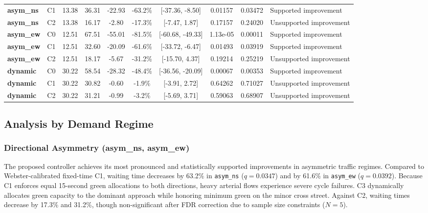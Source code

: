 \documentclass[11pt,journal,onecolumn]{article}
\begin{document}
\begin{table}[htbp]
\begin{tabularx}{\textwidth}{lccccccccX}
\textbf{asym\_ns} & C1 & 13.38 & 36.31 & -22.93 & -63.2\% & [-37.36, -8.50] & 0.01157 & 0.03472 & Supported improvement \\
\textbf{asym\_ns} & C2 & 13.38 & 16.17 & -2.80 & -17.3\% & [-7.47, 1.87] & 0.17157 & 0.24020 & Unsupported improvement \\
\midrule
\textbf{asym\_ew} & C0 & 12.51 & 67.51 & -55.01 & -81.5\% & [-60.68, -49.33] & 1.13e-05 & 0.00011 & Supported improvement \\
\textbf{asym\_ew} & C1 & 12.51 & 32.60 & -20.09 & -61.6\% & [-33.72, -6.47] & 0.01493 & 0.03919 & Supported improvement \\
\textbf{asym\_ew} & C2 & 12.51 & 18.17 & -5.67 & -31.2\% & [-15.70, 4.37] & 0.19214 & 0.25219 & Unsupported improvement \\
\midrule
\textbf{dynamic} & C0 & 30.22 & 58.54 & -28.32 & -48.4\% & [-36.56, -20.09] & 0.00067 & 0.00353 & Supported improvement \\
\textbf{dynamic} & C1 & 30.22 & 30.82 & -0.60 & -1.9\% & [-3.91, 2.72] & 0.64262 & 0.71027 & Unsupported improvement \\
\textbf{dynamic} & C2 & 30.22 & 31.21 & -0.99 & -3.2\% & [-5.69, 3.71] & 0.59063 & 0.68907 & Unsupported improvement \\
\bottomrule
\end{tabularx}
\end{table}

\subsection{Analysis by Demand Regime}
\subsubsection{Directional Asymmetry (asym\_ns, asym\_ew)}
The proposed controller achieves its most pronounced and statistically supported improvements in asymmetric traffic regimes. Compared to Webster-calibrated fixed-time C1, waiting time decreases by 63.2\% in \texttt{asym\_ns} ($q = 0.0347$) and by 61.6\% in \texttt{asym\_ew} ($q = 0.0392$). Because C1 enforces equal 15-second green allocations to both directions, heavy arterial flows experience severe cycle failures. C3 dynamically allocates green capacity to the dominant approach while honoring minimum green on the minor cross street. Against C2, waiting times decrease by 17.3\% and 31.2\%, though non-significant after FDR correction due to sample size constraints ($N=5$).
\end{document}
